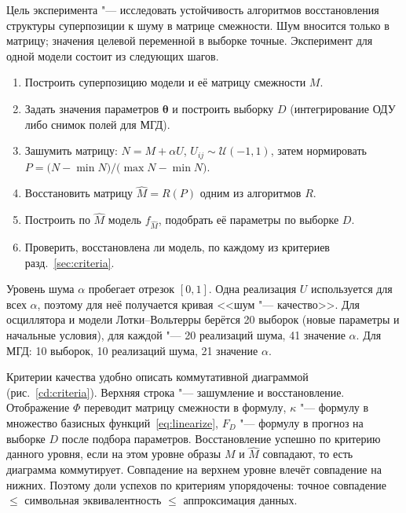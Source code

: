 \documentclass[12pt]{article}
\newcommand{\tht}{\bm{\theta}}
\begin{document}
Цель эксперимента "--- исследовать устойчивость алгоритмов восстановления структуры суперпозиции к шуму в матрице смежности. Шум вносится только в матрицу; значения целевой переменной в выборке точные. Эксперимент для одной модели состоит из следующих шагов.
\begin{enumerate}[nosep]
\item Построить суперпозицию модели и её матрицу смежности $M$.
\item Задать значения параметров $\tht$ и построить выборку $D$ (интегрирование ОДУ либо снимок полей для МГД).
\item Зашумить матрицу: $N=M+\alpha U$, $U_{ij}\sim\mathcal U(-1,1)$, затем нормировать $P=\bigl(N-\min N\bigr)/\bigl(\max N-\min N\bigr)$.
\item Восстановить матрицу $\hat M=R(P)$ одним из алгоритмов $R$.
\item Построить по $\hat M$ модель $f_{\hat M}$, подобрать её параметры по выборке $D$.
\item Проверить, восстановлена ли модель, по каждому из критериев разд.~\ref{sec:criteria}.
\end{enumerate}
Уровень шума $\alpha$ пробегает отрезок $[0,1]$. Одна реализация $U$ используется для всех $\alpha$, поэтому для неё получается кривая <<шум "--- качество>>. Для осциллятора и модели Лотки--Вольтерры берётся 20 выборок (новые параметры и начальные условия), для каждой "--- 20 реализаций шума, 41 значение $\alpha$. Для МГД: 10 выборок, 10 реализаций шума, 21 значение $\alpha$.

Критерии качества удобно описать коммутативной диаграммой (рис.~\ref{cd:criteria}). Верхняя строка "--- зашумление и восстановление. Отображение $\Phi$ переводит матрицу смежности в формулу, $\kappa$ "--- формулу в множество базисных функций~\eqref{eq:linearize}, $F_D$ "--- формулу в прогноз на выборке $D$ после подбора параметров. Восстановление успешно по критерию данного уровня, если на этом уровне образы $M$ и $\hat M$ совпадают, то есть диаграмма коммутирует. Совпадение на верхнем уровне влечёт совпадение на нижних. Поэтому доли успехов по критериям упорядочены: точное совпадение $\leqslant$ символьная эквивалентность $\leqslant$ аппроксимация данных.
\end{document}
